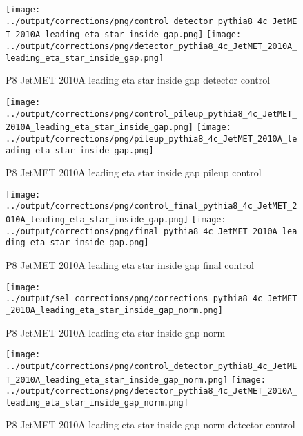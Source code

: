 \documentclass[11pt]{book}
\begin{document}
\begin{figure}[ht]
\centering
\texttt{[image: ../output/corrections/png/control\_detector\_pythia8\_4c\_JetMET\_2010A\_leading\_eta\_star\_inside\_gap.png]}
\texttt{[image: ../output/corrections/png/detector\_pythia8\_4c\_JetMET\_2010A\_leading\_eta\_star\_inside\_gap.png]}
\caption{P8 JetMET 2010A leading eta star inside gap detector control}
\label{fig:p8_JetMET_2010A_leading_eta_star_inside_gap_detector_control}
\end{figure}

\begin{figure}[ht]
\centering
\texttt{[image: ../output/corrections/png/control\_pileup\_pythia8\_4c\_JetMET\_2010A\_leading\_eta\_star\_inside\_gap.png]}
\texttt{[image: ../output/corrections/png/pileup\_pythia8\_4c\_JetMET\_2010A\_leading\_eta\_star\_inside\_gap.png]}
\caption{P8 JetMET 2010A leading eta star inside gap pileup control}
\label{fig:p8_JetMET_2010A_leading_eta_star_inside_gap_pileup_control}
\end{figure}


\begin{figure}[ht]
\centering
\texttt{[image: ../output/corrections/png/control\_final\_pythia8\_4c\_JetMET\_2010A\_leading\_eta\_star\_inside\_gap.png]}
\texttt{[image: ../output/corrections/png/final\_pythia8\_4c\_JetMET\_2010A\_leading\_eta\_star\_inside\_gap.png]}
\caption{P8 JetMET 2010A leading eta star inside gap final control}
\label{fig:p8_JetMET_2010A_leading_eta_star_inside_gap_final_control}
\end{figure}



\begin{figure}[ht]
\centering
\texttt{[image: ../output/sel\_corrections/png/corrections\_pythia8\_4c\_JetMET\_2010A\_leading\_eta\_star\_inside\_gap\_norm.png]}
\caption{P8 JetMET 2010A leading eta star inside gap norm}
\label{fig:p8_JetMET_2010A_leading_eta_star_inside_gap_norm}
\end{figure}

\begin{figure}[ht]
\centering
\texttt{[image: ../output/corrections/png/control\_detector\_pythia8\_4c\_JetMET\_2010A\_leading\_eta\_star\_inside\_gap\_norm.png]}
\texttt{[image: ../output/corrections/png/detector\_pythia8\_4c\_JetMET\_2010A\_leading\_eta\_star\_inside\_gap\_norm.png]}
\caption{P8 JetMET 2010A leading eta star inside gap norm detector control}
\label{fig:p8_JetMET_2010A_leading_eta_star_inside_gap_norm_detector_control}
\end{figure}
\end{document}
